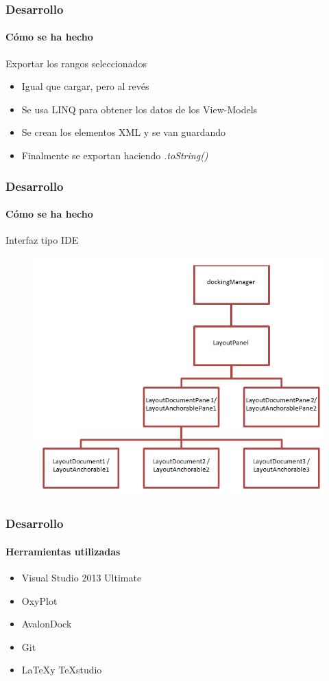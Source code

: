 \begin{frame}
    \frametitle{Desarrollo}
    \framesubtitle{C\'omo se ha hecho}
    
    \begin{block}{Exportar los rangos seleccionados}
        
        \begin{itemize}
            \item Igual que cargar, pero al rev\'es
            \item Se usa LINQ para obtener los datos de los View-Models
            \item Se crean los elementos XML y se van guardando
            \item Finalmente se exportan haciendo \emph{.toString()}
        \end{itemize}
        
    \end{block}
\end{frame}

\begin{frame}
    \frametitle{Desarrollo}
    \framesubtitle{C\'omo se ha hecho}
    
    \begin{block}{Interfaz tipo IDE}
        \begin{figure}
            \centering
            \includegraphics[width=0.6\linewidth]{Figures/AvalonDock.PNG}
        \end{figure}
        

    \end{block}
\end{frame}

\begin{frame}
	\frametitle{Desarrollo}
	\framesubtitle{Herramientas utilizadas}
	
	\begin{itemize}
		\item Visual Studio 2013 Ultimate
		\item OxyPlot
		\item AvalonDock
		\item Git
		\item \LaTeX y TeXstudio
	\end{itemize}
\end{frame}